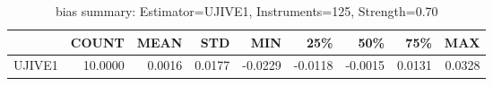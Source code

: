 \begin{table}[ht]
\centering
\caption{bias summary: Estimator=UJIVE1, Instruments=125, Strength=0.70}
\begin{tabular}{lrrrrrrrr}
\toprule
 & COUNT & MEAN & STD & MIN & 25\% & 50\% & 75\% & MAX \\
\midrule
UJIVE1 & 10.0000 & 0.0016 & 0.0177 & -0.0229 & -0.0118 & -0.0015 & 0.0131 & 0.0328 \\
\bottomrule
\end{tabular}
\end{table}
